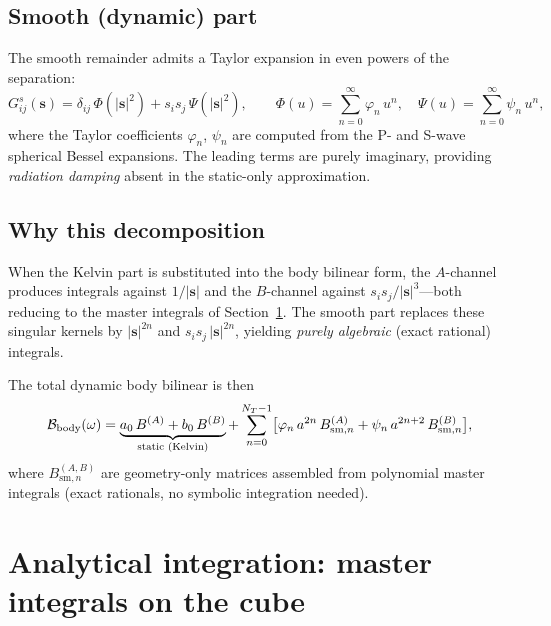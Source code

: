 \documentclass[11pt,a4paper]{article}
\newcommand{\bs}{\bm{s}}
\newcommand{\Bbody}{\mathcal{B}_{\mathrm{body}}}
\theoremstyle{plain}
\theoremstyle{definition}
\theoremstyle{remark}
\begin{document}
\subsection{Smooth (dynamic) part}

The smooth remainder admits a Taylor expansion in even powers of the
separation:
\begin{equation}
  G^s_{ij}(\bs) = \delta_{ij}\,\Phi(|\bs|^2) + s_i s_j\,\Psi(|\bs|^2),
  \qquad
  \Phi(u) = \sum_{n=0}^\infty \varphi_n\,u^n,
  \quad
  \Psi(u) = \sum_{n=0}^\infty \psi_n\,u^n,
  \label{eq:green-smooth}
\end{equation}
where the Taylor coefficients $\varphi_n$, $\psi_n$ are computed from
the P- and S-wave spherical Bessel expansions.  The leading terms are
purely imaginary, providing \emph{radiation damping} absent in the
static-only approximation.

\subsection{Why this decomposition}

When the Kelvin part is substituted into the body bilinear form, the
$A$-channel produces integrals against $1/|\bs|$ and the $B$-channel
against $s_i s_j/|\bs|^3$---both reducing to the master integrals of
Section~\ref{sec:master-integrals}.  The smooth part replaces these
singular kernels by $|\bs|^{2n}$ and $s_i s_j\,|\bs|^{2n}$,
yielding \emph{purely algebraic} (exact rational) integrals.

The total dynamic body bilinear is then
\begin{equation}
  \Bbody(\omega) = \underbrace{a_0\,B^{(A)} + b_0\,B^{(B)}}_{%
    \text{static (Kelvin)}}
  + \sum_{n=0}^{N_T-1}
    \bigl[\varphi_n\,a^{2n}\,B^{(A)}_{\mathrm{sm},n}
      + \psi_n\,a^{2n+2}\,B^{(B)}_{\mathrm{sm},n}\bigr],
  \label{eq:bbody-dynamic}
\end{equation}
where $B^{(A,B)}_{\mathrm{sm},n}$ are geometry-only matrices assembled
from polynomial master integrals (exact rationals, no symbolic
integration needed).


\section{Analytical integration: master integrals on the cube}
\label{sec:master-integrals}
\end{document}
